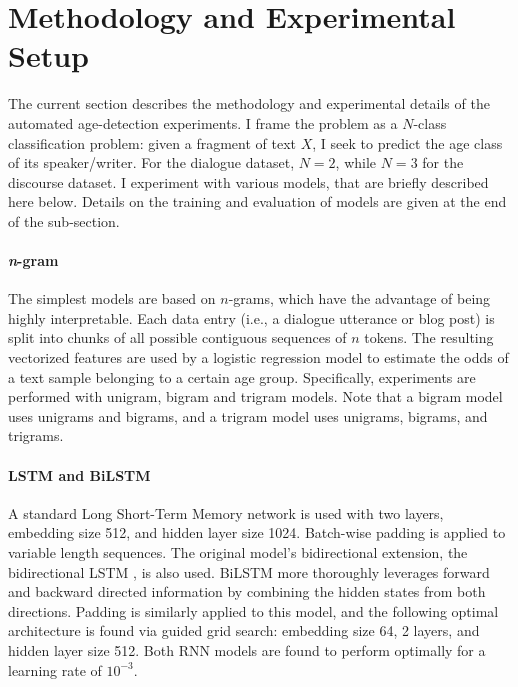 \section{Methodology and Experimental Setup}
\label{sec:exp1_methods_exp_setup}

The current section describes the methodology and experimental details of the automated age-detection experiments. I frame the problem as a $N$-class classification problem: given a fragment of text $X$, I seek to predict
the age class of its speaker/writer.
For the dialogue dataset, $N=2$, while $N=3$ for the discourse dataset.
I experiment with various models, that are briefly described here below. Details on the training and evaluation of models are given at the end of the sub-section.


\paragraph{\textit{n}-gram} 
The simplest models are based on $n$-grams, which have the advantage of being highly interpretable.
Each data entry (i.e., a dialogue utterance or blog post) is split into chunks of all possible contiguous sequences of $n$ tokens. The resulting vectorized features are used by a logistic regression model to estimate the odds of a text sample belonging to a certain age group. Specifically, experiments are performed with unigram, bigram and trigram models. Note that a bigram model uses unigrams and bigrams, and a trigram model uses unigrams, bigrams, and trigrams.

\paragraph{LSTM and BiLSTM}
A standard Long Short-Term Memory network \cite[LSTM;][]{hochreiter1997long} is used with two layers, embedding size 512, and hidden layer size 1024. Batch-wise padding is applied to variable length sequences. The original model's bidirectional extension, the bidirectional LSTM \cite[BiLSTM;][]{schuster1997bidirectional}, is also used.
BiLSTM more thoroughly leverages forward and backward directed information by combining the hidden states from both directions. Padding is similarly applied to this model, and the following optimal architecture is found via guided grid search: embedding size 64, 2 layers, and hidden layer size 512. Both RNN models are found to perform optimally for a learning rate of $10^{-3}$.

